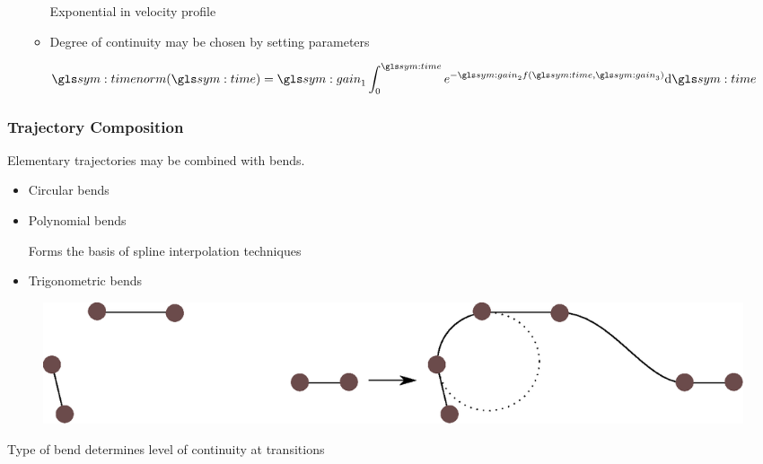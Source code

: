 \documentclass{beamer}
\begin{document}
\begin{frame}
\begin{itemize}
\begin{itemize}
						Exponential in velocity profile

					\item

						Degree of continuity may be chosen by setting parameters
				\end{itemize}

				\begin{equation}
					\timenorm(\timesym) = \gain_1\int_{0}^{\timesym}
						e^{-\gain_2 f(\timesym, \gain_3)} \der \timesym
				\end{equation}

		\end{itemize}
	\end{frame}

	\begin{frame}
		\frametitle{Trajectory Composition}

		Elementary trajectories may be combined with bends.

		\begin{itemize}

			\item

				Circular bends

			\item

				Polynomial bends

				Forms the basis of spline interpolation techniques

			\item

				Trigonometric bends

		\end{itemize}

		\begin{figure}
			\includegraphics[width=\textwidth]{trajectory_composition}
		\end{figure}

		Type of bend determines level of continuity at transitions

	\end{frame}
\end{document}
